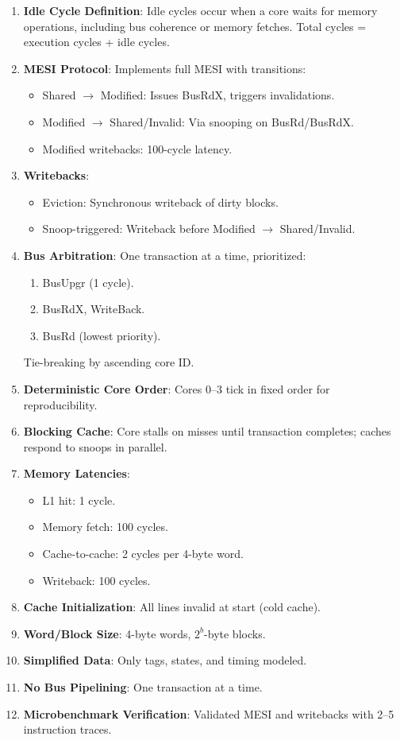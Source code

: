 \documentclass[11pt]{article}
\begin{document}
\begin{enumerate}
    \item \textbf{Idle Cycle Definition}: Idle cycles occur when a core waits for memory operations, including bus coherence or memory fetches. Total cycles = execution cycles + idle cycles.
    \item \textbf{MESI Protocol}: Implements full MESI with transitions:
        \begin{itemize}
            \item Shared $\to$ Modified: Issues BusRdX, triggers invalidations.
            \item Modified $\to$ Shared/Invalid: Via snooping on BusRd/BusRdX.
            \item Modified writebacks: 100-cycle latency.
        \end{itemize}
    \item \textbf{Writebacks}:
        \begin{itemize}
            \item Eviction: Synchronous writeback of dirty blocks.
            \item Snoop-triggered: Writeback before Modified $\to$ Shared/Invalid.
        \end{itemize}
    \item \textbf{Bus Arbitration}: One transaction at a time, prioritized:
        \begin{enumerate}
            \item BusUpgr (1 cycle).
            \item BusRdX, WriteBack.
            \item BusRd (lowest priority).
        \end{enumerate}
        Tie-breaking by ascending core ID.
    \item \textbf{Deterministic Core Order}: Cores 0–3 tick in fixed order for reproducibility.
    \item \textbf{Blocking Cache}: Core stalls on misses until transaction completes; caches respond to snoops in parallel.
    \item \textbf{Memory Latencies}:
        \begin{itemize}
            \item L1 hit: 1 cycle.
            \item Memory fetch: 100 cycles.
            \item Cache-to-cache: 2 cycles per 4-byte word.
            \item Writeback: 100 cycles.
        \end{itemize}
    \item \textbf{Cache Initialization}: All lines invalid at start (cold cache).
    \item \textbf{Word/Block Size}: 4-byte words, $2^b$-byte blocks.
    \item \textbf{Simplified Data}: Only tags, states, and timing modeled.
    \item \textbf{No Bus Pipelining}: One transaction at a time.
    \item \textbf{Microbenchmark Verification}: Validated MESI and writebacks with 2–5 instruction traces.
\end{enumerate}
\end{document}
